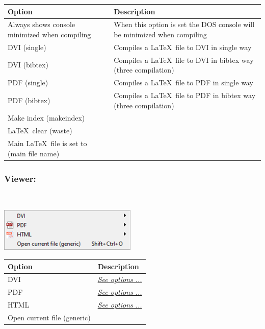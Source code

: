 \begin{scriptsize}
  \begin{tabularx}{\textwidth}{>{\hsize=0.5\hsize}X>{\hsize=0.7\hsize}X}\\
    \hline
    \textbf{Option} & \textbf{Description} \\
    \hline
    Always shows console minimized when compiling & When this option is set the DOS
     console will be minimized when compiling \\
    \hdashline[1pt/1pt]
    DVI (single) & Compiles a \LaTeX ~file to DVI in single way \\
    DVI (bibtex) & Compiles a \LaTeX ~file to DVI in bibtex way (three compilation) \\
    \hdashline[1pt/1pt]
    PDF (single) & Compiles a \LaTeX ~file to PDF in single way \\
    PDF (bibtex) & Compiles a \LaTeX ~file to PDF in bibtex way (three compilation) \\
    \hdashline[1pt/1pt]
    Make index (makeindex) \\
    \LaTeX ~clear (waste) \\
    Main \LaTeX ~file is set to (main file name) \\
    \hline
  \end{tabularx}
\end{scriptsize}


\hypertarget{menu_tools_processing_viewer}{}
\subsubsection{Viewer:}\\

\includegraphics[scale=0.50]{./res/menu_tools_processing_viewer.png}\\

\begin{scriptsize}
  \begin{tabularx}{\textwidth}{>{\hsize=0.3\hsize}X>{\hsize=0.7\hsize}X}\\
    \hline
    \textbf{Option} & \textbf{Description} \\
    \hline
    DVI  & \textit{\href{\#menu\_tools\_processing\_viewer\_DVI}{See options ...}} \\
    PDF  & \textit{\href{\#menu\_tools\_processing\_viewer\_pdf}{See options ...}} \\
    HTML & \textit{\href{\#menu\_tools\_processing\_viewer\_html}{See options ...}} \\
    Open current file (generic) \\
    \hline
  \end{tabularx}
\end{scriptsize}


